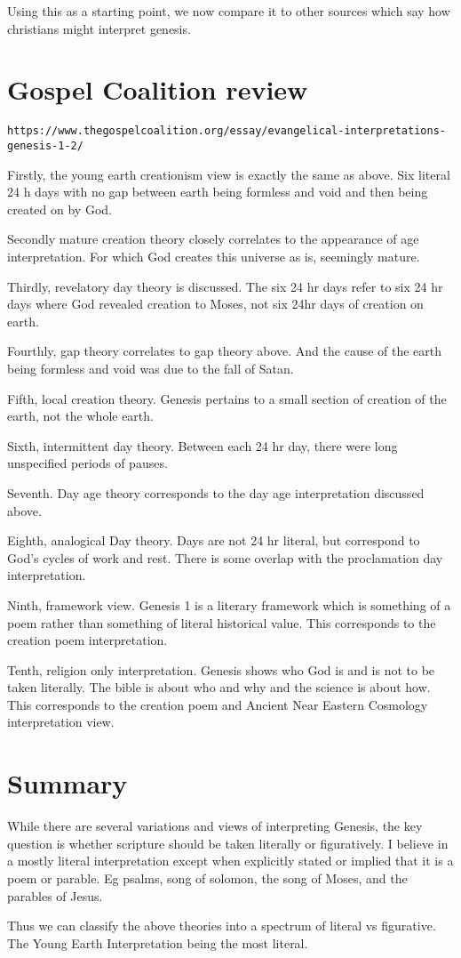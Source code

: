 \documentclass[11]{article}
\begin{document}
Using this as a starting point, we now compare it to other sources which say how christians might interpret genesis. 

\section{Gospel Coalition review}

\begin{verbatim}
https://www.thegospelcoalition.org/essay/evangelical-interpretations-genesis-1-2/
\end{verbatim}

Firstly, the young earth creationism view is exactly the same as above. Six literal 24 h days with no gap between earth being formless and void and then being created on by God.

Secondly mature creation theory closely correlates to the appearance of age interpretation. For which God creates this universe as is, seemingly mature. 

Thirdly, revelatory day theory is discussed. The six 24 hr days refer to six 24 hr days where God revealed creation to Moses, not six 24hr days of creation on earth.

Fourthly, gap theory correlates to gap theory above. And the cause of the earth being formless and void was due to the fall of Satan. 

Fifth, local creation theory. Genesis pertains to a small section of creation of the earth, not the whole earth.

Sixth, intermittent day theory. Between each 24 hr day, there were long unspecified periods of pauses. 

Seventh. Day age theory corresponds to the day age interpretation discussed above.

Eighth, analogical Day theory. Days are not 24 hr literal, but correspond to God's cycles of work and rest. There is some overlap with the proclamation day interpretation.

Ninth, framework view. Genesis 1 is a literary framework which is something of a poem rather than something of literal historical value. This corresponds to the creation poem interpretation. 

Tenth, religion only interpretation. Genesis shows who God is and is not to be taken literally. The bible is about who and why and the science is about how. This corresponds to the creation poem and Ancient Near Eastern Cosmology interpretation view.

\section{Summary}

While there are several variations and views of interpreting Genesis, the key question is whether scripture should be taken literally or figuratively. I believe in a mostly literal interpretation except when explicitly stated or implied that it is a poem or parable. Eg psalms, song of solomon, the song of Moses, and the parables of Jesus. 

Thus we can classify the above theories into a spectrum of literal vs figurative. The Young Earth Interpretation being the most literal. 
\end{document}
